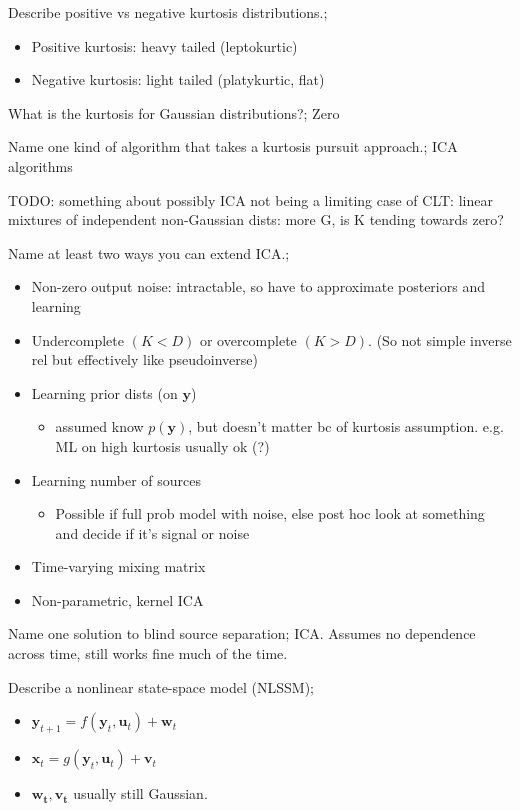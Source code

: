 \documentclass{article}
\begin{document}
Describe positive vs negative kurtosis distributions.; \begin{itemize}
    \item Positive kurtosis: heavy tailed (leptokurtic)
    \item Negative kurtosis: light tailed (platykurtic, flat)
\end{itemize}

What is the kurtosis for Gaussian distributions?; Zero

Name one kind of algorithm that takes a kurtosis pursuit approach.; ICA algorithms

TODO: something about possibly ICA not being a limiting case of CLT: linear mixtures of independent non-Gaussian dists: more G, is K tending towards zero?

Name at least two ways you can extend ICA.; \begin{itemize}
    \item Non-zero output noise: intractable, so have to approximate posteriors and learning
    \item Undercomplete $(K<D)$ or overcomplete $(K>D)$. (So not simple inverse rel but effectively like pseudoinverse)
    \item Learning prior dists (on $\mathbf{y}$) \begin{itemize}
        \item assumed know $p(\mathbf{y})$, but doesn't matter bc of kurtosis assumption. e.g. ML on high kurtosis usually ok (?)
    \end{itemize}
    \item Learning number of sources \begin{itemize}
        \item Possible if full prob model with noise, else post hoc look at something and decide if it's signal or noise
    \end{itemize}
    \item Time-varying mixing matrix
    \item Non-parametric, kernel ICA
\end{itemize}

Name one solution to blind source separation; ICA. Assumes no dependence across time, still works fine much of the time.

Describe a nonlinear state-space model (NLSSM); \begin{itemize}
    \item $\mathbf{y}_{t+1}=f(\mathbf{y}_t, \mathbf{u}_t)+\mathbf{w}_t$
    \item $\mathbf{x}_t=g(\mathbf{y}_t, \mathbf{u}_t)+\mathbf{v}_t$
    \item $\mathbf{w_t, v_t}$ usually still Gaussian.
\end{itemize}
\end{document}
